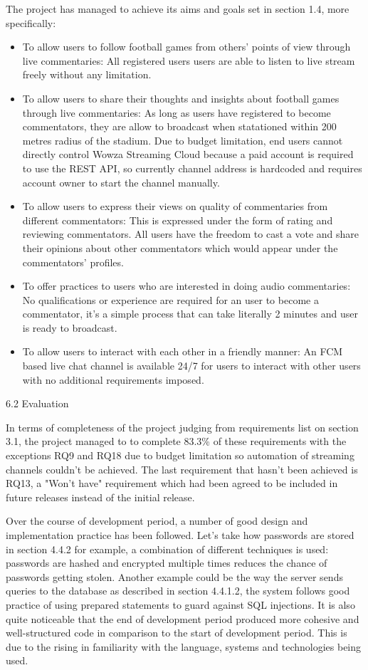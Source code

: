 \documentclass{article}
\begin{document}
\begin{flushleft}
The project has managed to achieve its aims and goals set in section 1.4, more specifically:
\begin{itemize}
	\item To allow users to follow football games from others' points of view through live commentaries: All registered users users are able to listen to live stream freely without any limitation.
	\item To allow users to share their thoughts and insights about football games through live commentaries: As long as users have registered to become commentators, they are allow to broadcast when statationed within 200 metres radius of the stadium. Due to budget limitation, end users cannot directly control Wowza Streaming Cloud because a paid account is required to use the REST API, so currently channel address is hardcoded and requires account owner to start the channel manually.
	\item To allow users to express their views on quality of commentaries from different commentators: This is expressed under the form of rating and reviewing commentators. All users have the freedom to cast a vote and share their opinions about other commentators which would appear under the commentators' profiles.
	\item To offer practices to users who are interested in doing audio commentaries: No qualifications or experience are required for an user to become a commentator, it's a simple process that can take literally 2 minutes and user is ready to broadcast.
	\item To allow users to interact with each other in a friendly manner: An FCM based live chat channel is available 24/7 for users to interact with other users with no additional requirements imposed.
\end{itemize}
{\Large 6.2 Evaluation}\par
In terms of completeness of the project judging from requirements list on section 3.1, the project managed to to complete 83.3\% of these requirements with the exceptions RQ9 and RQ18 due to budget limitation so automation of streaming channels couldn't be achieved. The last requirement that hasn't been achieved is RQ13, a "Won't have" requirement which had been agreed to be included in future releases instead of the initial release.\par
Over the course of development period, a number of good design and implementation practice has been followed. Let's take how passwords are stored in section 4.4.2 for example, a combination of different techniques is used: passwords are hashed and encrypted multiple times reduces the chance of passwords getting stolen. Another example could be the way the server sends queries to the database as described in section 4.4.1.2, the system follows good practice of using prepared statements to guard against SQL injections. It is also quite noticeable that the end of development period produced more cohesive and well-structured code in comparison to the start of development period. This is due to the rising in familiarity with the language, systems and technologies being used. \par

\end{flushleft}
\end{document}
